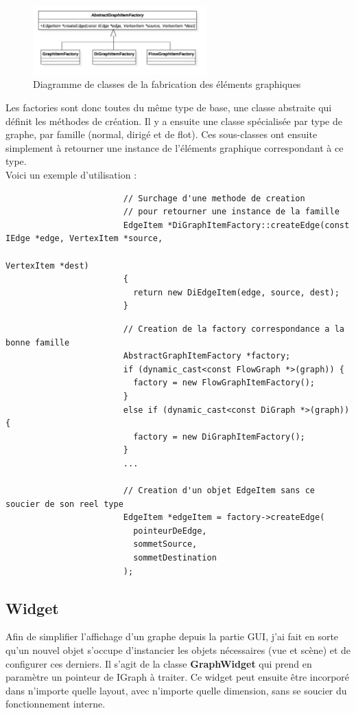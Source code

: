 \documentclass[french]{article}
\begin{document}
			\begin{figure}[H]
				\centering
				\includegraphics[width=0.6\textwidth]{Conception/visualization/graphitemsfactories.png}
				\caption{Diagramme de classes de la fabrication des éléments graphiques}
			\end{figure}
			
			Les factories sont donc toutes du même type de base, une classe abstraite qui définit les méthodes de création. Il y a ensuite une classe spécialisée par type de graphe, par famille (normal, dirigé et de flot). Ces sous-classes ont ensuite simplement à retourner une instance de l'éléments graphique correspondant à ce type. \\
			
			Voici un exemple d'utilisation :
		
			\begin{lstlisting}
						// Surchage d'une methode de creation
						// pour retourner une instance de la famille
						EdgeItem *DiGraphItemFactory::createEdge(const IEdge *edge, VertexItem *source,
																 VertexItem *dest)
						{
						  return new DiEdgeItem(edge, source, dest);
						}
			\end{lstlisting}
			
			\begin{lstlisting}
						// Creation de la factory correspondance a la bonne famille
						AbstractGraphItemFactory *factory;
						if (dynamic_cast<const FlowGraph *>(graph)) {
						  factory = new FlowGraphItemFactory();
						}
						else if (dynamic_cast<const DiGraph *>(graph)) {
						  factory = new DiGraphItemFactory();
						}
						...
						
						// Creation d'un objet EdgeItem sans ce soucier de son reel type
						EdgeItem *edgeItem = factory->createEdge(
						  pointeurDeEdge,
						  sommetSource,
						  sommetDestination
						);

			\end{lstlisting}
		
		\pagebreak
		
		\subsection{Widget}
			Afin de simplifier l'affichage d'un graphe depuis la partie GUI, j'ai fait en sorte qu'un nouvel objet s'occupe d'instancier les objets nécessaires (vue et scène) et de configurer ces derniers. Il s'agit de la classe \textbf{GraphWidget} qui prend en paramètre un pointeur de IGraph à traiter. Ce widget peut ensuite être incorporé dans n'importe quelle layout, avec n'importe quelle dimension, sans se soucier du fonctionnement interne.
			
\end{document}
